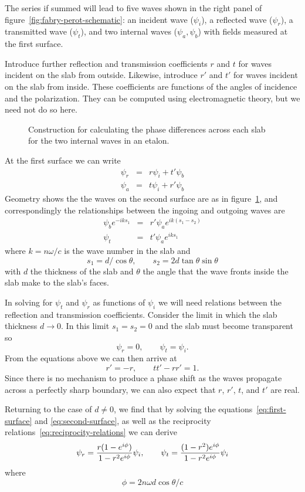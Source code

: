 \documentclass{article}
\newcommand{\be}{\begin{equation}}
\newcommand{\ee}{\end{equation}}
\newcommand{\bea}[1]{\begin{eqnarray}\label{#1}}
\newcommand{\eea}{\end{eqnarray}}
\begin{document}
The series if summed will lead to five waves shown in the right panel of figure~\ref{fig:fabry-perot-schematic}: an incident wave ($\psi_i$), a reflected wave
($\psi_r$),  a transmitted wave ($\psi_t$), and two internal waves ($\psi_a,\psi_b$) 
with fields measured at the first surface. 

Introduce further reflection and transmission coefficients $r$ and $t$ for waves incident
on the slab from outside. Likewise, introduce $r'$ and $t'$ for waves incident on the slab
from inside. These coefficients are functions of the angles of incidence and the polarization. They can be computed using electromagnetic theory, but we need not do so here. 

\begin{figure}[h]
  \centering  {}
  \caption{Construction for calculating the phase differences across each slab for the
two internal waves in an etalon.}
  \label{fig:fabry-phase-diff}
\end{figure}

At the first surface we can write
\bea{eq:first-surface}
\psi_r&=&r\psi_i+t'\psi_b \nonumber \\
\psi_a&=&t\psi_i+r'\psi_b
\eea
\noindent
Geometry shows the the waves on the second surface are as in figure~\ref{fig:fabry-phase-diff}, and correspondingly the relationships between the ingoing and outgoing waves are 
\bea{eq:second-surface}
\psi_be^{-iks_1}&=&r'\psi_ae^{ik(s_1-s_2)} \nonumber \\
\psi_t&=&t'\psi_ae^{iks_1}
\eea
\noindent
where $k={n\omega/c}$ is the wave number in the slab and 
\[
s_1={d/\cos\theta},\qquad s_2=2d\tan\theta\sin\theta
\]
with $d$ the thickness of the slab and $\theta$ the angle that the wave fronts inside the
slab make to the slab's faces.

In solving for $\psi_t$ and $\psi_r$ as functions of $\psi_i$ we will need relations between the reflection and transmission coefficients. Consider the limit in which the
slab thickness $d\rightarrow 0$. In this limit $s_1=s_2=0$ and the slab must become
transparent so 
\[ \psi_r=0, \qquad \psi_t=\psi_i. \]
From the equations above we can then arrive at 
\be r'=-r, \qquad tt'-rr'=1. \label{eq:reciprocity-relations}\ee
Since there is no mechanism to produce a phase shift as the waves propagate across a 
perfectly sharp boundary, we can also expect that $r$, $r'$, $t$, and $t'$ are real. 

Returning to the case of $d\ne 0$, we find that by solving the equations~\ref{eq:first-surface} and \ref{eq:second-surface}, as well as the reciprocity relations~\ref{eq:reciprocity-relations} we can derive
\[ \psi_r={r(1-e^{i\phi})\over 1-r^2e^{i\phi}}\psi_i,\qquad
    \psi_t={(1-r^2)e^{i\phi}\over 1-r^2e^{i\phi}}\psi_i
\]
\noindent 
where
\[
\phi={2n\omega d\cos\theta/c}
\]
\end{document}
